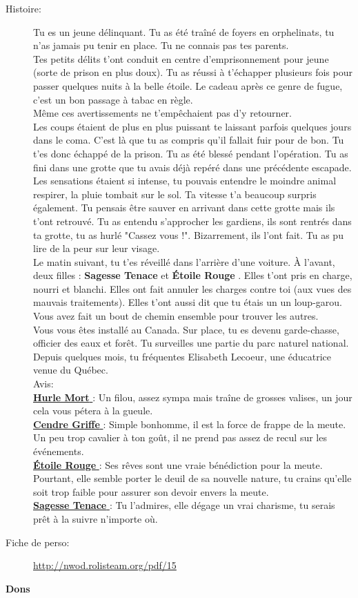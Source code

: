 \documentclass[oneside,12pt]{book}
\newcommand{\Lynn}{\textbf{Étoile Rouge} }
\newcommand{\Jessica}{\textbf{Sagesse Tenace} }
\newcommand{\Luke}{\textbf{Cendre Griffe} }
\newcommand{\Peter}{\textbf{Hurle Mort} }
\begin{document}
\begin{flushleft}
\begin{description}
\item[Histoire:]{
Tu es un jeune délinquant. Tu as été traîné de foyers en orphelinats, tu n'as jamais pu tenir en place. 
Tu ne connais pas tes parents.\\ 
Tes petits délits t'ont conduit en centre d'emprisonnement pour jeune (sorte de prison en plus doux). 
Tu as réussi à t'échapper plusieurs fois pour passer quelques nuits à la belle étoile. 
Le cadeau après ce genre de fugue, c'est un bon passage à tabac en règle. \\
Même ces avertissements ne t'empêchaient pas d'y retourner. \\
Les coups étaient de plus en plus puissant te laissant parfois quelques jours dans le coma. 
C'est là que tu as compris qu'il fallait fuir pour de bon. Tu t'es donc échappé de la prison. 
Tu as été blessé pendant l'opération. Tu as fini dans une grotte que tu avais déjà repéré dans une précédente escapade. Les sensations étaient si intense, tu pouvais entendre le moindre animal respirer, la pluie tombait sur le sol. Ta vitesse t'a beaucoup surpris également. Tu pensais être sauver en arrivant dans cette grotte mais ils t'ont retrouvé.
Tu as entendu s'approcher les gardiens, ils sont rentrés dans ta grotte, tu as hurlé "Cassez vous !". 
Bizarrement, ils l'ont fait. Tu as pu lire de la peur sur leur visage. \\
Le matin suivant, tu t'es réveillé dans l'arrière d'une voiture. À l'avant, deux filles : \Jessica et \Lynn. Elles t'ont pris en charge, nourri et blanchi. 
Elles ont fait annuler les charges contre toi (aux vues des mauvais traitements). Elles t'ont aussi dit que tu étais un un loup-garou. Vous avez fait un bout de chemin ensemble pour trouver les autres. \\
Vous vous êtes installé au Canada. Sur place, tu es devenu garde-chasse, officier des eaux et forêt. Tu surveilles une  partie du parc naturel national. \\ 
Depuis quelques mois, tu fréquentes Elisabeth Lecoeur, une éducatrice venue du Québec.\\ 
Avis:\\
\underline{\Peter} : Un filou, assez sympa mais traîne de grosses valises, un jour cela vous pétera à la gueule.\\
\underline{\Luke} : Simple bonhomme, il est la force de frappe de la meute. Un peu trop cavalier à ton goût, il ne prend pas assez de recul sur les événements.\\
\underline{\Lynn}  : Ses rêves sont une vraie bénédiction pour la meute. Pourtant, elle semble porter le deuil de sa nouvelle nature, tu crains qu'elle soit trop faible pour assurer son devoir envers la meute.\\
\underline{\Jessica}: Tu l'admires, elle dégage un vrai charisme, tu serais prêt à la suivre n'importe où.\\
}
\item[Fiche de perso:]{\href{http://nwod.rolisteam.org/pdf/15}{http://nwod.rolisteam.org/pdf/15}}
\end{description}
\clearpage
\textbf{\large Dons} 
\vspace{0.5cm}


\end{flushleft}
\end{document}
